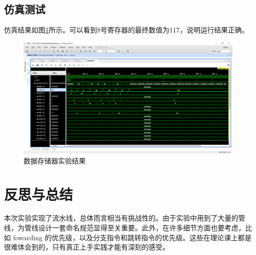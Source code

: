\documentclass{progartcn}
\begin{document}
\subsection{仿真测试}

仿真结果如图\ref{fig:1}所示。可以看到8号寄存器的最终数值为117，说明运行结果正确。

\begin{figure}[htbp]
    \centering
    \includegraphics[scale=0.3]{../figure/06/lab06-1.PNG}
    \caption{数据存储器实验结果}\label{fig:1}
\end{figure}

\section{反思与总结}

本次实验实现了流水线，总体而言相当有挑战性的。由于实验中用到了大量的管线，为管线设计一套命名规范显得至关重要。此外，在许多细节方面也要考虑，比如 fowarding 的优先级，以及分支指令和跳转指令的优先级。这些在理论课上都是很难体会到的，只有真正上手实践才能有深刻的感受。
\end{document}
